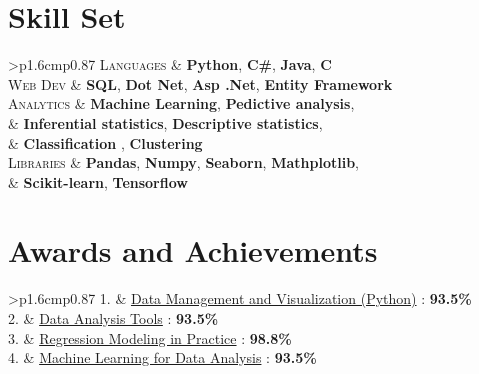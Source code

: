 \documentclass[a4paper]{article} %
\newcommand{\itemlist}[1]{%
    \def\arraystretch{1.2}
    \begin{tabular}{>{\raggedleft}p{1.6cm}p{0.87\linewidth}}
        #1
    \end{tabular}
    \def\arraystretch{1.0}
}
\begin{document}
\begin{multicols}{2}
\section{Skill Set}
    {%
        \itemlist {%
                \textsc{\small Languages} %
                & \textbf{Python}, \textbf{C\#}, \textbf{Java}, \textbf{C} \\

                \textsc{\small Web Dev} %
                & \textbf{SQL}, \textbf{Dot Net}, \textbf{Asp .Net}, \textbf{Entity Framework} \\

                \textsc{\small Analytics} %
                & \textbf{Machine Learning}, \textbf{Pedictive analysis}, \\ 
                \textsc{\small } %
                & \textbf{Inferential statistics}, \textbf{Descriptive statistics}, \\
                \textsc{\small } %
                & \textbf{Classification }, \textbf{Clustering} \\
                
                \textsc{\small Libraries} %
                & \textbf{Pandas}, \textbf{Numpy}, \textbf{Seaborn}, \textbf{Mathplotlib}, \\
                \textsc{\small } %
                & \textbf{Scikit-learn}, \textbf{Tensorflow} \\
                
                \textsc{\small } %
                
            }
    }
 
\columnbreak
 
\section{Awards and Achievements}

{%
        \itemlist {%
                \textsc{\small 1. } %
                & {\href{https://www.coursera.org/account/accomplishments/certificate/BKFTEPR83L8Y} {Data Management and Visualization (Python)} : \textbf{93.5\%}}  \\

                \textsc{\small 2. } %
                & {\href{https://www.coursera.org/account/accomplishments/certificate/EM29BAUXMCVT} {Data Analysis Tools} : \textbf{93.5\%}}  \\

                \textsc{\small 3. } %
                & {\href{https://www.coursera.org/account/accomplishments/certificate/QNG3Q8RJRZUX} {Regression Modeling in Practice} : \textbf{98.8\%}}  \\
                
                \textsc{\small 4. } %
                & {\href{https://www.coursera.org/account/accomplishments/certificate/HAKPGPJLA3ST} {Machine Learning for Data Analysis} : \textbf{93.5\%}}  \\
                
            }
    }
\end{multicols}
\end{document}
